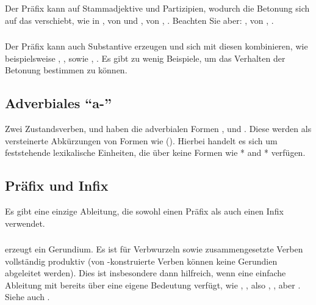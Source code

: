 \subsubsection{} Der Pr\"afix  kann auf Stammadjektive und Partizipien, wodurch die
Betonung sich auf das  verschiebt, wie in ,  von
  und ,  von
, . Beachten Sie aber: ,  von
, .\label{lingop:prefix:ke}

\subsubsection{} Der Pr\"afix  kann auch Substantive erzeugen und sich mit diesen
kombinieren, wie beispielsweise , , sowie ,
.
Es gibt zu wenig Beispiele, um das Verhalten der Betonung bestimmen zu k\"onnen.


\subsection{Adverbiales "`a-"'} Zwei Zustandsverben,   und
  haben die adverbialen Formen ,  und
 . Diese werden als versteinerte Abk\"urzungen von Formen wie
 (). Hierbei handelt es sich um feststehende
lexikalische Einheiten, die \"uber keine Formen wie * and * verf\"ugen.


\subsection{Pr\"afix und Infix} Es gibt eine einzige Ableitung, die sowohl einen Pr\"afix
als auch einen Infix verwendet.

\subsubsection{}  erzeugt ein Gerundium. Es ist f\"ur Verbwurzeln sowie
zusammengesetzte Verben vollst\"andig produktiv (von -konstruierte Verben k\"onnen
keine Gerundien abgeleitet werden). Dies ist insbesondere dann hilfreich, wenn eine
einfache Ableitung mit  bereits \"uber eine eigene Bedeutung verf\"ugt, wie
, , also , , aber
 . Siehe auch .
\label{lingop:gerund}



